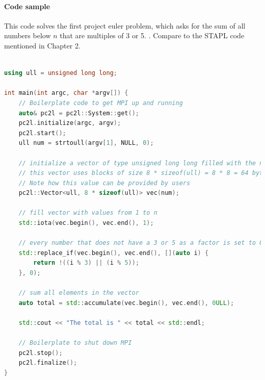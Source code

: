\paragraph{Code sample}
This code solves the first project euler problem, which asks for the sum of all numbers below $n$ that are multiples of 3 or 5. \cite{euler_1}. Compare to the STAPL code mentioned in Chapter 2.
\scriptsize
\begin{lstlisting}[language=C++, caption=PC2L code sample for Project Euler number 1. Headers removed for brevity, captionpos=b]

using ull = unsigned long long;

int main(int argc, char *argv[]) {
    // Boilerplate code to get MPI up and running
    auto& pc2l = pc2l::System::get();
    pc2l.initialize(argc, argv);
    pc2l.start();
    ull num = strtoull(argv[1], NULL, 0);

    // initialize a vector of type unsigned long long filled with the number specified by 2nd command line argument
    // this vector uses blocks of size 8 * sizeof(ull) = 8 * 8 = 64 bytes (on most systems)
    // Note how this value can be provided by users
    pc2l::Vector<ull, 8 * sizeof(ull)> vec(num);

    // fill vector with values from 1 to n
    std::iota(vec.begin(), vec.end(), 1);

    // every number that does not have a 3 or 5 as a factor is set to 0
    std::replace_if(vec.begin(), vec.end(), [](auto i) {
        return !((i % 3) || (i % 5));
    }, 0);

    // sum all elements in the vector
    auto total = std::accumulate(vec.begin(), vec.end(), 0ULL);

    std::cout << "The total is " << total << std::endl;

    // Boilerplate to shut down MPI
    pc2l.stop();
    pc2l.finalize();
}
\end{lstlisting}
\normalsize
